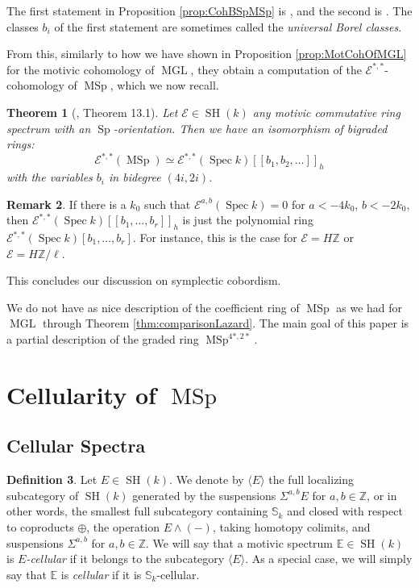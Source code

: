 \documentclass[10pt]{amsart}
\theoremstyle{definition}
\newtheorem{defn}{Definition}[section]
\newtheorem{rmk}[defn]{Remark}
\theoremstyle{plain}
\newtheorem{thm}[defn]{Theorem}
\numberwithin{equation}{section}
\newcommand{\0}{\emptyset}
\newcommand{\sE}{{\mathcal E}}
\newcommand{\E}{{\mathbb E}}
\newcommand{\Z}{{\mathbb Z}}
\newcommand{\MGL}{{\operatorname{MGL}}}
\newcommand{\MSp}{{\operatorname{MSp}}}
\newcommand{\Sp}{{\operatorname{Sp}}}
\newcommand{\Spec}{{\operatorname{Spec}}}
\newcommand{\SH}{{\operatorname{SH}}}
\begin{document}
The first statement in Proposition \ref{prop:CohBSpMSp} is \cite[Theorem 9.1]{Panwal-cobordism}, and the second is \cite[Theorem 9.3]{Panwal-cobordism}. The classes $b_i$ of the first statement are sometimes called the \emph{universal Borel classes}.

From this, similarly to how we have shown in Proposition \ref{prop:MotCohOfMGL} for the motivic cohomology of $\MGL$, they obtain a computation of the $\sE^{*,*}$-cohomology of $\MSp$, which we now recall. 

\begin{thm}[\cite{Panwal-cobordism}, Theorem 13.1]
\label{thm:cohomologyofmsp}
    Let $\sE \in \SH(k)$ any motivic commutative ring spectrum with an $\Sp$-orientation. Then we have an isomorphism of bigraded rings:
    $$\sE^{*,*}(\MSp)\simeq \sE^{*,*}(\Spec k)[[b_1,b_2,\ldots]]_h$$
    with the variables $b_i$ in bidegree $(4i,2i)$.
\end{thm}

\begin{rmk}
\label{rmk:homogeneous}
If there is a $k_0$ such that $\sE^{a,b}(\Spec k)=0$ for $a<-4k_0$, $b<-2k_0$, then $\sE^{*,*}(\Spec k)[[b_1,\ldots, b_r]]_h$ is just the polynomial ring $\sE^{*,*}(\Spec k)[b_1,\ldots, b_r]$. For instance, this is the case for $\sE=H\Z$ or $\sE=H\Z/\ell$.
\end{rmk}

This concludes our discussion on symplectic cobordism.

We do not have as nice description of the coefficient ring of $\MSp$ as we had for $\MGL$ through Theorem \ref{thm:comparisonLazard}. The main goal of this paper is a partial description of the graded ring $\MSp^{4*,2*}$. 

\section{Cellularity of $\MSp$}

\subsection{Cellular Spectra}
\begin{defn}
\label{defn:motivicCellular}
    Let $E \in \SH(k)$. We denote by $\langle E \rangle$ the full localizing subcategory of $\SH(k)$ generated by the suspensions $\Sigma^{a,b}E$ for $a,b \in \Z$, or in other words, the smallest full subcategory containing $\mathbb{S}_k$ and closed with respect to coproducts $\oplus$, the operation $E \wedge (-)$, taking homotopy colimits, and suspensions $\Sigma^{a,b}$ for $a,b \in \Z$. We will say that a motivic spectrum $\E \in \SH(k)$ is \emph{$E$-cellular} if it belongs to the subcategory $\langle E \rangle$. As a special case, we will simply say that $\E$ is \emph{cellular} if it is $\mathbb{S}_k$-cellular.
\end{defn}
\end{document}
